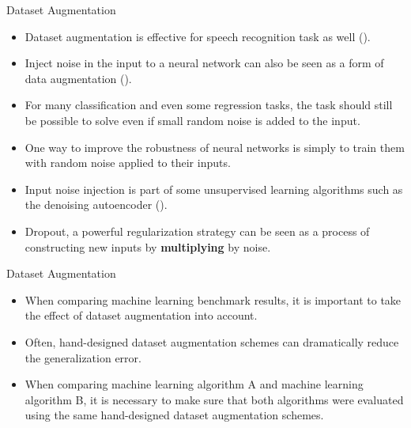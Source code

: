 \documentclass[10pt]{beamer}
\begin{document}
	\begin{frame}{Dataset Augmentation}
		\begin{itemize}
			\item Dataset augmentation is effective for speech recognition task as well (\citet{jaitly2013vocal}).
			\pause
			\item Inject noise in the input to a neural network can also be seen as a form of data augmentation (\citet{sietsma1991creating}).
			\pause
			\item For many classification and even some regression tasks, the task should still be possible to solve even if small random noise is added to the input.
			\pause
			\item One way to improve the robustness of neural networks is simply to train them with random noise applied to their inputs.
			\pause
			\item Input noise injection is part of some unsupervised learning algorithms such as the denoising autoencoder (\citet{vincent2008extracting}).
			\pause
			\item Dropout, a powerful regularization strategy can be seen as a process of constructing new inputs by \textbf{multiplying} by noise.
		\end{itemize}
	\end{frame}

	\begin{frame}{Dataset Augmentation}
		\begin{itemize}
			\item When comparing machine learning benchmark results, it is important to take the effect of dataset augmentation into account.
			\pause
			\item Often, hand-designed dataset augmentation schemes can dramatically reduce the generalization error.
			\pause
			\item When comparing machine learning algorithm A and machine learning algorithm B, it is necessary to make sure that both algorithms were evaluated using the same hand-designed dataset augmentation schemes.
		\end{itemize}
	\end{frame}
\end{document}
